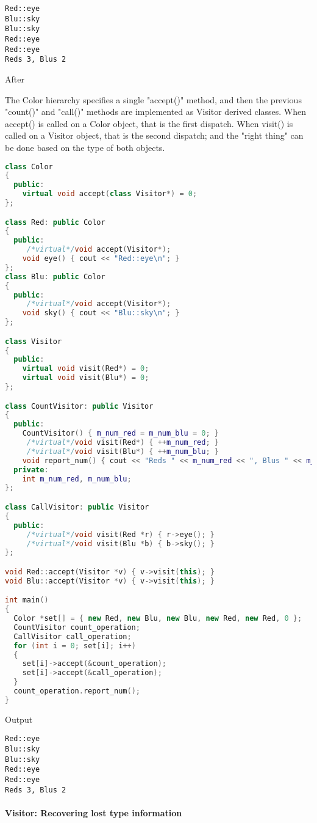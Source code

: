 \documentclass{book}
\begin{document}
\begin{verbatim}
Red::eye
Blu::sky
Blu::sky
Red::eye
Red::eye
Reds 3, Blus 2
\end{verbatim}


After

The Color hierarchy specifies a single "accept()" method, and then the previous "count()" and "call()" methods are implemented as Visitor derived classes. 
When accept() is called on a Color object, that is the first dispatch. 
When visit() is called on a Visitor object, that is the second dispatch; and the "right thing" can be done based on the type of both objects.

\begin{lstlisting}[caption={After},label={lst:af},language=C++]
class Color
{
  public:
    virtual void accept(class Visitor*) = 0;
};

class Red: public Color
{
  public:
     /*virtual*/void accept(Visitor*);
    void eye() { cout << "Red::eye\n"; }
};
class Blu: public Color
{
  public:
     /*virtual*/void accept(Visitor*);
    void sky() { cout << "Blu::sky\n"; }
};

class Visitor
{
  public:
    virtual void visit(Red*) = 0;
    virtual void visit(Blu*) = 0;
};

class CountVisitor: public Visitor
{
  public:
    CountVisitor() { m_num_red = m_num_blu = 0; }
     /*virtual*/void visit(Red*) { ++m_num_red; }
     /*virtual*/void visit(Blu*) { ++m_num_blu; }
    void report_num() { cout << "Reds " << m_num_red << ", Blus " << m_num_blu << '\n'; }
  private:
    int m_num_red, m_num_blu;
};

class CallVisitor: public Visitor
{
  public:
     /*virtual*/void visit(Red *r) { r->eye(); }
     /*virtual*/void visit(Blu *b) { b->sky(); }
};

void Red::accept(Visitor *v) { v->visit(this); }
void Blu::accept(Visitor *v) { v->visit(this); }

int main()
{
  Color *set[] = { new Red, new Blu, new Blu, new Red, new Red, 0 };
  CountVisitor count_operation;
  CallVisitor call_operation;
  for (int i = 0; set[i]; i++)
  {
    set[i]->accept(&count_operation);
    set[i]->accept(&call_operation);
  }
  count_operation.report_num();
}
\end{lstlisting}
Output
\begin{verbatim}
Red::eye
Blu::sky
Blu::sky
Red::eye
Red::eye
Reds 3, Blus 2
\end{verbatim}

\paragraph{Visitor: Recovering lost type information}
\end{document}
